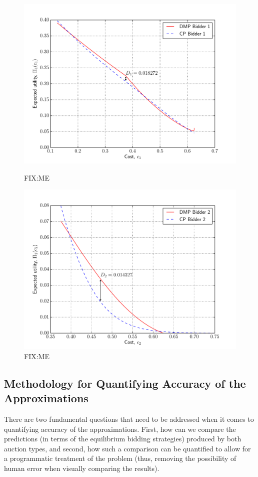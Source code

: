 \begin{figure}[p!]
  \includegraphics[width=\figsize]{Approximation/Figures/test_compare_bidder_1}
  \caption{FIX:ME}
  \label{fig:test_compare_bidder_1_approximation}
  \vspace{10mm}
  \includegraphics[width=\figsize]{Approximation/Figures/test_compare_bidder_2}
  \caption{FIX:ME}
  \label{fig:test_compare_bidder_2_approximation}
\end{figure}

\subsection{Methodology for Quantifying Accuracy of the Approximations} %
\label{sub:methodology_for_quantifying_accuracy_of_the_approximations_approximation}
There are two fundamental questions that need to be addressed when it comes to quantifying accuracy of the approximations. First, how can we compare the predictions (in terms of the equilibrium bidding strategies) produced by both auction types, and second, how such a comparison can be quantified to allow for a programmatic treatment of the problem (thus, removing the possibility of human error when visually comparing the results).

